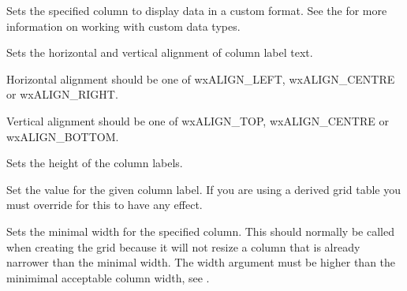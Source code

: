 \label{wxgridsetcolformatcustom}


Sets the specified column to display data in a custom format.
See the  for more information on working
with custom data types.



\label{wxgridsetcollabelalignment}


Sets the horizontal and vertical alignment of column label text.

Horizontal alignment should be one of wxALIGN\_LEFT, wxALIGN\_CENTRE or wxALIGN\_RIGHT.

Vertical alignment should be one of wxALIGN\_TOP, wxALIGN\_CENTRE or wxALIGN\_BOTTOM.



\label{wxgridsetcollabelsize}


Sets the height of the column labels.



\label{wxgridsetcollabelvalue}


Set the value for the given column label. If you are using a derived grid table you must
override 
for this to have any effect.



\label{wxgridsetcolminimalwidth}


Sets the minimal width for the specified column. This should normally be called when creating the grid
because it will not resize a column that is already narrower than the minimal width.
The width argument must be higher than the minimimal acceptable column width, see
.



